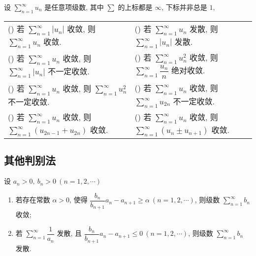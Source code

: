 \begin{theorem}
    设 $\displaystyle\sum_{n=1}^{\infty}u_n$ 是任意项级数, 其中 $\sum$ 的上标都是 $\infty$, 下标并非总是 $1$,
    \setcounter{magicrownumbers}{0}
    \begin{table}[H]
        \centering
        \begin{tabular}{l l}
            (\rownumber{}) 若 $\displaystyle \sum_{n=1}^{\infty}|u_n|$ 收敛, 则 $\displaystyle\sum_{n=1}^{\infty}u_n$ 收敛. & (\rownumber{}) 若 $\displaystyle\sum_{n=1}^{\infty}u_n$ 发散, 则 $\displaystyle\sum_{n=1}^{\infty}|u_n|$ 发散. \\ 
            (\rownumber{}) 若 $\displaystyle\sum_{n=1}^{\infty}u_n$ 收敛, 则 $\displaystyle\sum_{n=1}^{\infty}|u_n|$ 不一定收敛. & (\rownumber{}) 若 $\displaystyle\sum_{n=1}^{\infty}u^2_n$ 收敛, 则 $\displaystyle\sum_{n=1}^{\infty}\dfrac{u_n}{n}$ 绝对收敛.\\ 
            (\rownumber{}) 若 $\displaystyle\sum_{n=1}^{\infty}u_n$ 收敛, 则 $\displaystyle\sum_{n=1}^{\infty}u^2_n$ 不一定收敛. & (\rownumber{}) 若 $\displaystyle\sum_{n=1}^{\infty}u_n$ 收敛, 则 $\displaystyle\sum_{n=1}^{\infty}u_{2n}$ 不一定收敛. \\ 
            (\rownumber{}) 若 $\displaystyle\sum_{n=1}^{\infty}u_n$ 收敛, 则 $\displaystyle\sum_{n=1}^{\infty}(u_{2n-1}+u_{2n})$ 收敛. & (\rownumber{}) 若 $\displaystyle\sum_{n=1}^{\infty}u_n$ 收敛, 则 $\displaystyle\sum_{n=1}^{\infty}(u_{n}\pm u_{n+1})$ 收敛.
        \end{tabular}
    \end{table}
\end{theorem}

\subsection{其他判别法}

\begin{theorem}
    设 $a_n>0,~b_n>0~(n=1,2, \cdots )$\begin{enumerate}[label=(\arabic{*})]
        \item 若存在常数 $\alpha>0$, 使得 $\dfrac{b_n}{b_{n+1}}a_n-a_{n+1}\geqslant \alpha~(n=1,2, \cdots )$, 则级数 $\displaystyle \sum_{n=1}^{\infty}b_n$ 收敛; 
        \item 若 $\displaystyle \sum_{n=1}^{\infty}\dfrac{1}{a_n}$ 发散, 且 $\dfrac{b_n}{b_{n+1}}a_n-a_{n+1}\leqslant 0~(n=1,2, \cdots )$, 则级数 $\displaystyle \sum_{n=1}^{\infty}b_n$ 发散.
    \end{enumerate}
\end{theorem}

